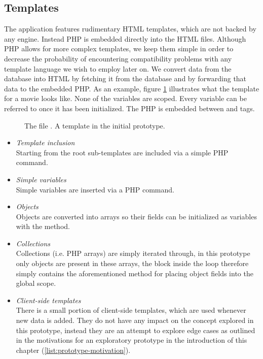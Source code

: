 \documentclass[thesis.tex]{subfiles}
\begin{document}
\subsection{Templates}
The application features rudimentary HTML templates, which are not backed by
any engine. Instead PHP is embedded directly into the HTML files.
Although PHP allows for more complex templates, we keep them simple in order to
decrease the probability of encountering compatibility problems with any
template language we wish to employ later on.
We convert data from the database into HTML by fetching it from the database and
by forwarding that data to the embedded PHP.
As an example, figure \ref{fig:movie.view.tpl} illustrates what the template
for a movie looks like.
None of the variables are scoped. Every variable can be referred to once it has
been initialized.
The PHP is embedded between  and  tags.

\begin{figure}
	\centering
	
	\caption{The file . A template in the initial prototype.}
	\label{fig:movie.view.tpl}
\end{figure}

\begin{itemize}
	\item \emph{Template inclusion}\\
	Starting from the root sub-templates are included via a simple
	PHP  command.
	\item \emph{Simple variables}\\
	Simple variables are inserted via a PHP  command.
	\item \emph{Objects}\\
	Objects are converted into arrays so their fields can be initialized as
	variables with the  method.
	\item \emph{Collections}\\
	Collections (i.e. PHP arrays) are simply iterated through, in this prototype
	only objects are present in these arrays, the block inside the
	 loop therefore simply contains the aforementioned method
	for placing object fields into the global scope.
	\item \emph{Client-side templates}\\
	There is a small portion of client-side templates, which are used whenever new
	data is added.  They do not have any impact on the concept explored in
	this prototype, instead they are an attempt to explore edge cases as outlined
	in the motivations for an exploratory prototype in the introduction of this
	chapter (\ref{list:prototype-motivation}).
\end{itemize}
\end{document}
